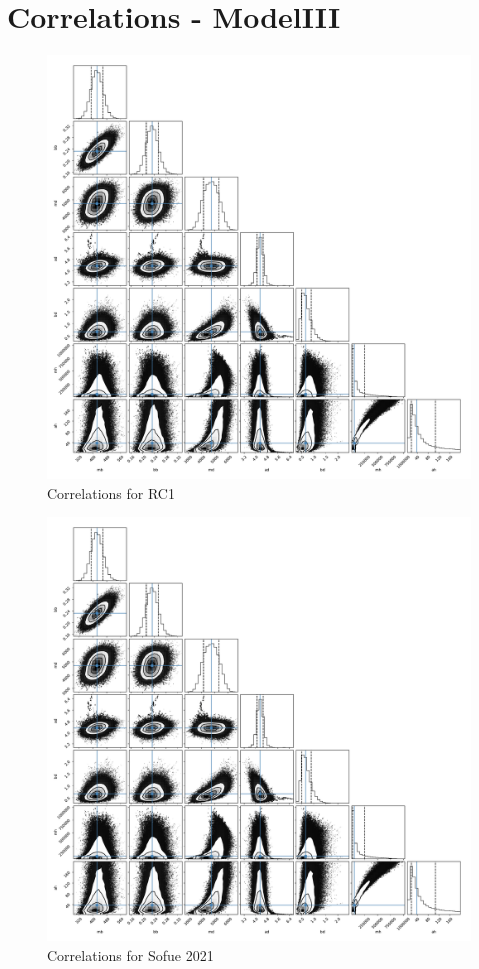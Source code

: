\documentclass[fleqn,usenatbib]{mnras}
\begin{document}
\section{Correlations - ModelIII}

\begin{figure}
\includegraphics[width=\columnwidth]{Model_III/Plots/Sofue(2009)/emcee_corner_10000_100.pdf}
\caption{Correlations for RC1
}
\label{fig:Model3_Sofue2009}
\end{figure}

\begin{figure}
\includegraphics[width=\columnwidth]{Model_III/Plots/Sofue(2009)/emcee_corner_10000_100.pdf}
\caption{Correlations for Sofue 2021
}
\label{fig:Model3_Sofue2021}
\end{figure}
\end{document}
